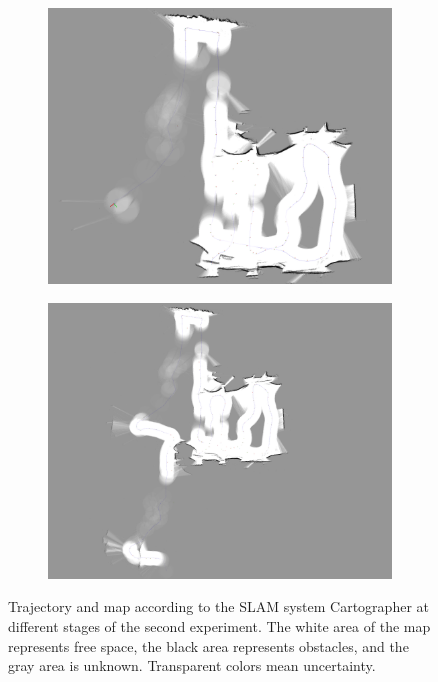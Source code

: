 \begin{figure}[h!]
{\begin{subfigure}[b]{0.5\textwidth}
		\centering
		\includegraphics[width=1\textwidth]{fig/results/ex2_slam_nice}
		\caption{}
	\end{subfigure}
	\begin{subfigure}[b]{0.5\textwidth}
		\centering
		\includegraphics[width=1\textwidth]{fig/results/ex2_slam_nice2}
		\caption{}
	\end{subfigure}
	}
\caption[Trajectory and map according to the SLAM system Cartographer at different stages of the second experiment.]{Trajectory and map according to the SLAM system Cartographer at different stages of the second experiment. The white area of the map represents free space, the black area represents obstacles, and the gray area is unknown. Transparent colors mean uncertainty.}
	\label{fig:ex2_slam}
\end{figure}

